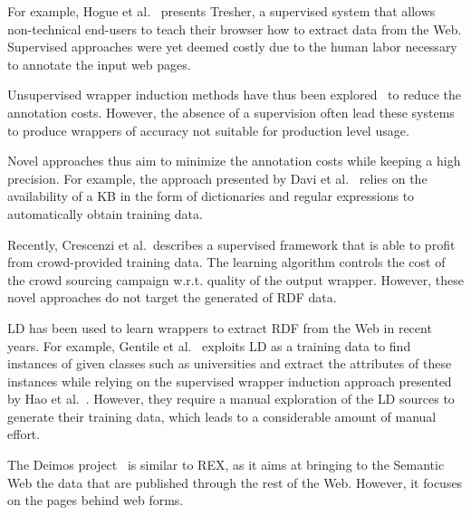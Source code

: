 For example, Hogue et al.~\cite{Hogue:2005:TAU:1060745.1060762} presents {Tresher}, a supervised system that allows non-technical end-users to teach their browser how to extract data from the Web. 
Supervised approaches were yet deemed costly due to the human labor necessary to annotate the input web pages. 

Unsupervised wrapper induction methods have thus been explored~\cite{exalg,DBLP:journals/aai/CrescenziM08} to reduce the annotation costs. 
However, the absence of a supervision often lead these systems to produce wrappers of accuracy not suitable for production level usage.

Novel approaches thus aim to minimize the annotation costs while keeping a high precision.
For example, the approach presented by Davi et al.~\cite{Dalvi:2011:AWL:1938545.1938547} relies on the availability of a  \ac{KB} in the form of dictionaries and regular expressions to automatically obtain training data. 

Recently, Crescenzi et al.~\cite{Crescenzi2013}describes a supervised framework that is able to profit from crowd-provided training data. 
The learning algorithm controls the cost of the crowd sourcing campaign w.r.t. quality of the output wrapper.
However, these novel approaches do not target the generated of \ac{RDF} data.

\ac{LD} has been used to learn wrappers to extract \ac{RDF} from the Web in recent years. 
For example, Gentile et al.~\cite{Gentile2013} exploits \ac{LD} as a training data to find instances of given classes such as universities and extract the attributes of these instances while relying on the supervised wrapper induction approach presented by Hao et al.~\cite{Hao2011}. However, they require a manual exploration of the \ac{LD} sources to generate their training data, which leads to a considerable amount of manual effort.

The {\sc Deimos} project~\cite{conf/aaaiss/ParundekarKA10} is similar to REX, as it aims at bringing to the Semantic Web the data that are published through the rest of the Web. 
However, it focuses on the pages behind web forms.


